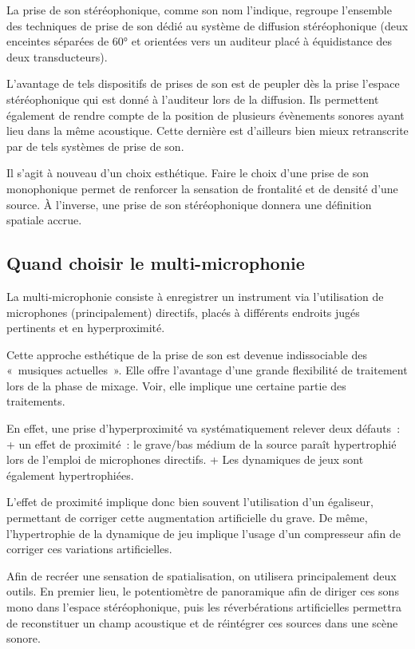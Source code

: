 \documentclass[
]{book}
\begin{document}
La prise de son stéréophonique, comme son nom l'indique, regroupe l'ensemble des techniques de prise de son dédié au système de diffusion stéréophonique (deux enceintes séparées de 60° et orientées vers un auditeur placé à équidistance des deux transducteurs).

L'avantage de tels dispositifs de prises de son est de peupler dès la prise l'espace stéréophonique qui est donné à l'auditeur lors de la diffusion. Ils permettent également de rendre compte de la position de plusieurs évènements sonores ayant lieu dans la même acoustique. Cette dernière est d'ailleurs bien mieux retranscrite par de tels systèmes de prise de son.

Il s'agit à nouveau d'un choix esthétique. Faire le choix d'une prise de son monophonique permet de renforcer la sensation de frontalité et de densité d'une source. À l'inverse, une prise de son stéréophonique donnera une définition spatiale accrue.

\hypertarget{quand-choisir-le-multi-microphonie}{%
\subsection{Quand choisir le multi-microphonie}\label{quand-choisir-le-multi-microphonie}}

La multi-microphonie consiste à enregistrer un instrument via l'utilisation de microphones (principalement) directifs, placés à différents endroits jugés pertinents et en hyperproximité.

Cette approche esthétique de la prise de son est devenue indissociable des «~musiques actuelles~». Elle offre l'avantage d'une grande flexibilité de traitement lors de la phase de mixage. Voir, elle implique une certaine partie des traitements.

En effet, une prise d'hyperproximité va systématiquement relever deux défauts~:
+ un effet de proximité~: le grave/bas médium de la source paraît hypertrophié lors de l'emploi de microphones directifs.
+ Les dynamiques de jeux sont également hypertrophiées.

L'effet de proximité implique donc bien souvent l'utilisation d'un égaliseur, permettant de corriger cette augmentation artificielle du grave. De même, l'hypertrophie de la dynamique de jeu implique l'usage d'un compresseur afin de corriger ces variations artificielles.

Afin de recréer une sensation de spatialisation, on utilisera principalement deux outils. En premier lieu, le potentiomètre de panoramique afin de diriger ces sons mono dans l'espace stéréophonique, puis les réverbérations artificielles permettra de reconstituer un champ acoustique et de réintégrer ces sources dans une scène sonore.
\end{document}
